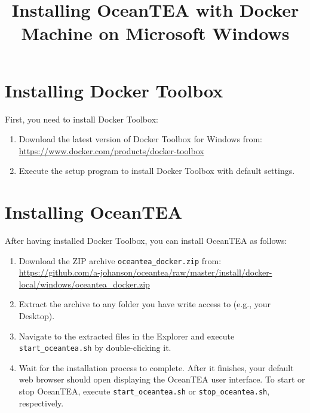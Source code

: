 \documentclass[11pt,a4paper,english,oneside,parskip=false]{scrartcl} %
\begin{document}
\title{Installing OceanTEA with Docker Machine on Microsoft Windows}
\date{}

\maketitle

\section{Installing Docker Toolbox} \label{sec:docker}

First, you need to install Docker Toolbox: 
\begin{enumerate}
	\item Download the latest version of Docker Toolbox for Windows from:\\ \url{https://www.docker.com/products/docker-toolbox}
	\item Execute the setup program to install Docker Toolbox with default settings. 
\end{enumerate}


\section{Installing OceanTEA} \label{sec:oceantea}

After having installed Docker Toolbox, you can install OceanTEA as follows:
\begin{enumerate}
	\item Download the ZIP archive \texttt{oceantea\_docker.zip} from:\\
	\url{https://github.com/a-johanson/oceantea/raw/master/install/docker-local/windows/oceantea_docker.zip}
	\item Extract the archive to any folder you have write access to (e.g., your Desktop).
	\item Navigate to the extracted files in the Explorer and execute \texttt{start\_oceantea.sh} by double\hyp{}clicking it.
	\item Wait for the installation process to complete. After it finishes, your default web browser should open displaying the OceanTEA user interface. 
	To start or stop OceanTEA, execute \texttt{start\_oceantea.sh} or \texttt{stop\_oceantea.sh}, respectively.
\end{enumerate}
\end{document}
